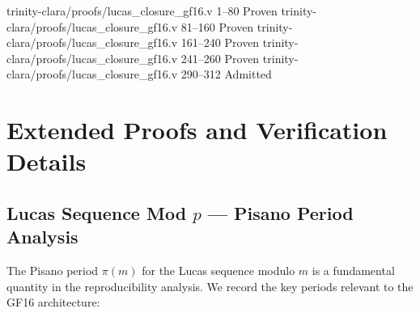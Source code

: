 
%
        {trinity-clara/proofs/lucas_closure_gf16.v}%
        {1--80}%
        {Proven}
%
        {trinity-clara/proofs/lucas_closure_gf16.v}%
        {81--160}%
        {Proven}
%
        {trinity-clara/proofs/lucas_closure_gf16.v}%
        {161--240}%
        {Proven}
%
        {trinity-clara/proofs/lucas_closure_gf16.v}%
        {241--260}%
        {Proven}
%
        {trinity-clara/proofs/lucas_closure_gf16.v}%
        {290--312}%
        {Admitted}


\section{Extended Proofs and Verification Details}
\label{sec:29-extended}

\subsection{Lucas Sequence Mod $p$ — Pisano Period Analysis}

The Pisano period $\pi(m)$ for the Lucas sequence modulo $m$ is a
fundamental quantity in the reproducibility analysis.  We record the
key periods relevant to the GF16 architecture:

